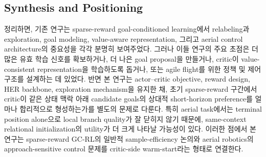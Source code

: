 \documentclass[journal]{IEEEtran}
\begin{document}
\subsection{Synthesis and Positioning}
정리하면, 기존 연구는 sparse-reward goal-conditioned learning에서 relabeling과 exploration, goal modeling, value-aware representation, 그리고 aerial control architecture의 중요성을 각각 분명히 보여주었다. 그러나 이들 연구의 주요 초점은 더 많은 유효 학습 신호를 확보하거나, 더 나은 goal proposal을 만들거나, critic이 value-consistent representation을 학습하도록 돕거나, 또는 agile flight를 위한 정책 및 제어 구조를 설계하는 데 있었다. 반면 본 연구는 actor--critic objective, reward design, HER backbone, exploration mechanism을 유지한 채, 초기 sparse-reward 구간에서 critic이 같은 상태 맥락 아래 candidate goals의 상대적 short-horizon preference를 얼마나 합리적으로 형성하는가를 별도의 문제로 다룬다. 특히 aerial task에서는 terminal position alone으로 local branch quality가 잘 닫히지 않기 때문에, same-context relational initialization의 utility가 더 크게 나타날 가능성이 있다. 이러한 점에서 본 연구는 sparse-reward GC-RL의 일반적 sample-efficiency 논의와 aerial robotics의 approach-sensitive control 문제를 critic-side warm-start라는 형태로 연결한다.


%
%

\end{document}
